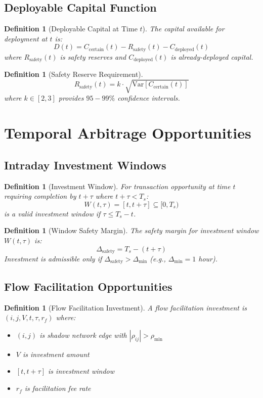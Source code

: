 \documentclass[12pt]{article}
\newtheorem{definition}[theorem]{Definition}
\begin{document}
\subsection{Deployable Capital Function}

\begin{definition}[Deployable Capital at Time $t$]
The capital available for deployment at $t$ is:
$$
D(t) = C_{\text{certain}}(t) - R_{\text{safety}}(t) - C_{\text{deployed}}(t)
$$
where $R_{\text{safety}}(t)$ is safety reserves and $C_{\text{deployed}}(t)$ is already-deployed capital.
\end{definition}

\begin{definition}[Safety Reserve Requirement]
$$
R_{\text{safety}}(t) = k \cdot \sqrt{\text{Var}[C_{\text{certain}}(t)]}
$$
where $k \in [2,3]$ provides $95-99\%$ confidence intervals.
\end{definition}

\section{Temporal Arbitrage Opportunities}

\subsection{Intraday Investment Windows}

\begin{definition}[Investment Window]
For transaction opportunity at time $t$ requiring completion by $t + \tau$ where $t + \tau < T_s$:
$$
W(t,\tau) = [t, t+\tau] \subseteq [0, T_s)
$$
is a valid investment window if $\tau \leq T_s - t$.
\end{definition}

\begin{definition}[Window Safety Margin]
The safety margin for investment window $W(t,\tau)$ is:
$$
\Delta_{\text{safety}} = T_s - (t + \tau)
$$
Investment is admissible only if $\Delta_{\text{safety}} > \Delta_{\min}$ (e.g., $\Delta_{\min} = 1$ hour).
\end{definition}

\subsection{Flow Facilitation Opportunities}

\begin{definition}[Flow Facilitation Investment]
A flow facilitation investment is $(i,j,V,t,\tau,r_f)$ where:
\begin{itemize}
    \item $(i,j)$ is shadow network edge with $|\rho_{ij}| > \rho_{\min}$
    \item $V$ is investment amount
    \item $[t, t+\tau]$ is investment window
    \item $r_f$ is facilitation fee rate
\end{itemize}
\end{definition}
\end{document}
